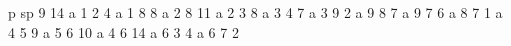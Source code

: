 p sp 9 14
a 1 2 4
a 1 8 8
a 2 8 11 
a 2 3 8
a 3 4 7
a 3 9 2
a 9 8 7 
a 9 7 6
a 8 7 1
a 4 5 9
a 5 6 10
a 4 6 14 
a 6 3 4 
a 6 7 2